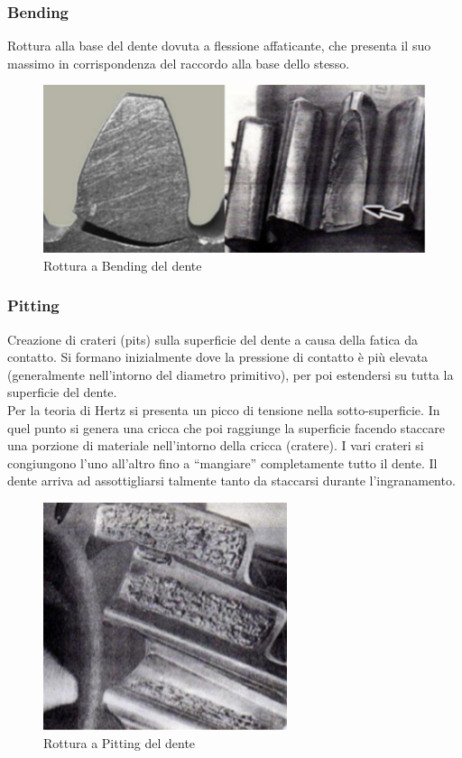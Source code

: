 \subsubsection{Bending}
Rottura alla base del dente dovuta a flessione affaticante, che presenta il suo massimo in corrispondenza del raccordo alla base dello stesso.
\begin{figure}[h]
    \centering
    \includegraphics[scale=0.7]{Immagini/Bending2.png}
    \caption{Rottura a Bending del dente}
    \label{fig:Bending2}
\end{figure}
\subsubsection{Pitting}
Creazione di crateri (pits) sulla superficie del dente a causa della fatica da contatto. 
Si formano inizialmente dove la pressione di contatto è più elevata (generalmente nell’intorno del diametro primitivo), per poi estendersi su tutta la superficie del dente.\\ 
Per la teoria di Hertz si presenta un picco di tensione nella sotto-superficie. In quel punto si genera una cricca che poi raggiunge la superficie facendo staccare una porzione di materiale nell’intorno della cricca (cratere). I vari crateri si congiungono l’uno all’altro fino a “mangiare” completamente tutto il dente. 
Il dente arriva ad assottigliarsi talmente tanto da staccarsi durante l’ingranamento.
\begin{figure}[h]
    \centering
    \includegraphics[scale=0.7]{Immagini/Pitting2.png}
    \caption{Rottura a Pitting del dente}
    \label{fig:Pitting2}
\end{figure}
